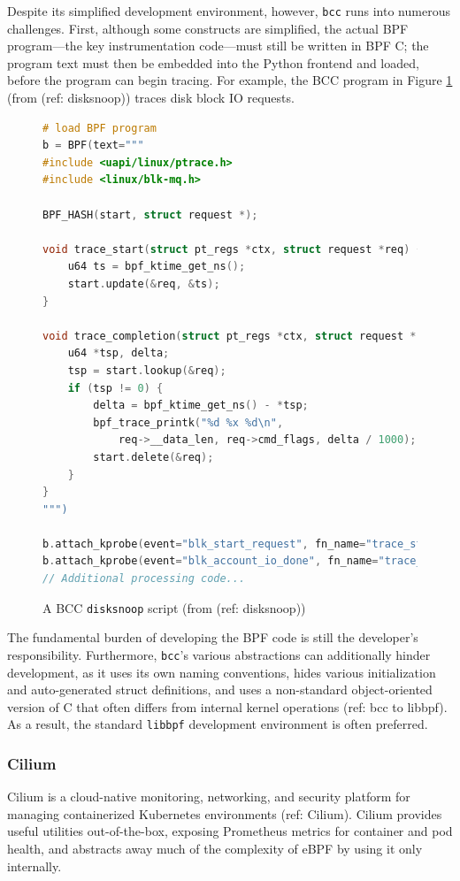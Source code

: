 Despite its simplified development environment, however, \texttt{bcc} runs into numerous challenges.
First, although some constructs are simplified, the actual BPF program---the key instrumentation
code---must still be written in BPF C; the program text must then be embedded into the Python
frontend and loaded, before the program can begin tracing. For example, the BCC program in Figure
\ref{code:bcc-example} (from (ref: disksnoop)) traces disk block IO requests.
\begin{figure}[htpb]
\begin{lstlisting}[language=C]
# load BPF program
b = BPF(text="""
#include <uapi/linux/ptrace.h>
#include <linux/blk-mq.h>

BPF_HASH(start, struct request *);

void trace_start(struct pt_regs *ctx, struct request *req) {
    u64 ts = bpf_ktime_get_ns();
    start.update(&req, &ts);
}

void trace_completion(struct pt_regs *ctx, struct request *req) {
    u64 *tsp, delta;
    tsp = start.lookup(&req);
    if (tsp != 0) {
        delta = bpf_ktime_get_ns() - *tsp;
        bpf_trace_printk("%d %x %d\n",
            req->__data_len, req->cmd_flags, delta / 1000);
        start.delete(&req);
    }
}
""")

b.attach_kprobe(event="blk_start_request", fn_name="trace_start")
b.attach_kprobe(event="blk_account_io_done", fn_name="trace_completion")
// Additional processing code...
\end{lstlisting}
\caption{A BCC \texttt{disksnoop} script (from (ref: disksnoop))}
\label{code:bcc-example}
\end{figure}

The fundamental burden of developing the BPF code is still the developer's responsibility.
Furthermore, \texttt{bcc}'s various abstractions can additionally hinder development, as it uses its
own naming conventions, hides various initialization and auto-generated struct definitions, and uses
a non-standard object-oriented version of C that often differs from internal kernel operations (ref:
bcc to libbpf). As a result, the standard \texttt{libbpf} development environment is often
preferred.

\subsubsection{Cilium}

Cilium is a cloud-native monitoring, networking, and security platform for managing containerized
Kubernetes environments (ref: Cilium). Cilium provides useful utilities out-of-the-box, exposing
Prometheus metrics for container and pod health, and abstracts away much of the complexity of eBPF
by using it only internally. 

